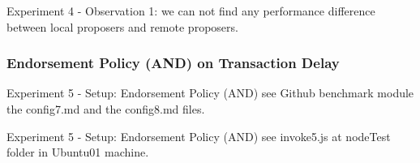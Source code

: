 \documentclass[10pt,journal,compsoc, twoside]{IEEEtran}
\begin{document}
Experiment 4 - Observation 1: we can not find any performance difference between local proposers and remote proposers.










\subsubsection{Endorsement Policy (AND) on Transaction Delay}

Experiment 5 - Setup: Endorsement Policy (AND) see Github benchmark module the config7.md and the config8.md files.

Experiment 5 - Setup: Endorsement Policy (AND) see invoke5.js at nodeTest folder in Ubuntu01 machine.
\end{document}
